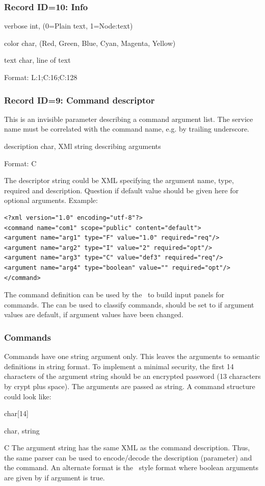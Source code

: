 \subsubsection{Record ID=10: Info}
\begin{compactdesc}
\item[verbose]   int,  (0=Plain text, 1=Node:text)
\item[color]   char,  (Red, Green, Blue, Cyan, Magenta, Yellow)
\item[text]   char,  line of text
\item[Format:] L:1;C:16;C:128
\end{compactdesc}

\subsubsection{Record ID=9: Command descriptor}
This is an invisible parameter describing a command argument list. The service name must be correlated with the command name, e.g. by trailing underscore.
\begin{compactdesc}
\item[description]   char,  XMl string describing arguments
\item[Format:] C
\end{compactdesc}

The descriptor string could be XML specifying the argument name, type, required and description. Question if default value should be given here for optional arguments. Example:
{\small \begin{verbatim}
<?xml version="1.0" encoding="utf-8"?>
<command name="com1" scope="public" content="default">
<argument name="arg1" type="F" value="1.0" required="req"/>
<argument name="arg2" type="I" value="2" required="opt"/>
<argument name="arg3" type="C" value="def3" required="req"/>
<argument name="arg4" type="boolean" value="" required="opt"/>
</command>
\end{verbatim}
}
The command definition can be used by the \gui\ to build input panels for commands. The  can be used to classify commands,  should be set to  if argument values are default,  if argument values have been changed.
\subsubsection{Commands}
Commands have one string argument only. This leaves the arguments to semantic definitions in string format. To implement a minimal security, the first 14 characters of the argument string should be an encrypted password (13 characters by crypt plus space). The arguments are passed as string. A command structure could look like:
\bdes
\item[password]   char[14]
\item[argument]   char,  string
\item[Format:] C
\edes
The argument string has the same XML as the command description. Thus, the same parser can be used to encode/decode the description (parameter) and the command. An alternate format is the \mbs\ style format  where boolean arguments are given by  if argument is true.
